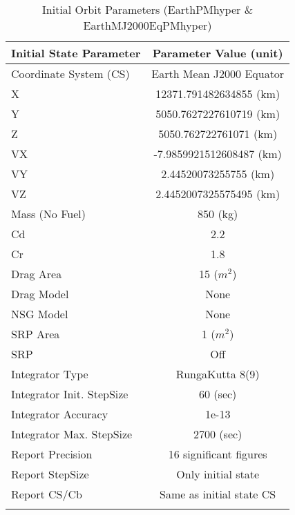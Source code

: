 \begin{table}[hbp!]
\centering \caption{Initial Orbit Parameters (EarthPMhyper \&
EarthMJ2000EqPMhyper)}
      \begin{tabular}{lc}
      \hline\hline
            Initial State Parameter & Parameter Value (unit)\\
            \hline
            Coordinate System (CS) & Earth Mean J2000 Equator\\
            X & 12371.791482634855 (km)\\
            Y & 5050.7627227610719 (km)\\
            Z & 5050.762722761071 (km)\\
            VX & -7.9859921512608487 (km)\\
            VY & 2.44520073255755 (km)\\
            VZ & 2.4452007325575495 (km)\\
            Mass (No Fuel) & 850 (kg)\\
            Cd & 2.2\\
            Cr & 1.8\\
            Drag Area & 15 ($m^2$)\\
            Drag Model & None\\
            NSG Model & None\\
            SRP Area & 1 ($m^2$)\\
            SRP & Off\\
            Integrator Type & RungaKutta 8(9)\\
            Integrator Init. StepSize & 60 (sec)\\
            Integrator Accuracy & 1e-13\\
            Integrator Max. StepSize & 2700 (sec)\\
            Report Precision & 16 significant figures\\
            Report StepSize & Only initial state\\
            Report CS/Cb & Same as initial state CS\\
      \hline\hline
      \label{Table: InitStopCondStatePMhyper}
\end{tabular}
\end{table}

